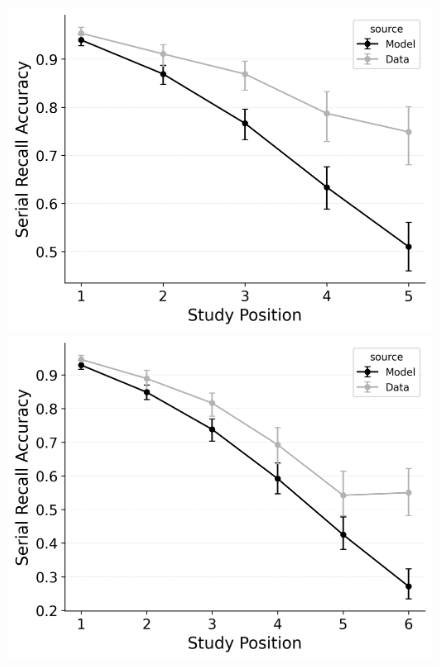 \documentclass[
  man,
  floatsintext,
  longtable,
  nolmodern,
  notxfonts,
  notimes,
  draftfirst,
  colorlinks=true,linkcolor=blue,citecolor=blue,urlcolor=blue]{apa7}
\begin{document}
\begin{figure}
\begin{minipage}{0.33\linewidth}
\includegraphics{figures/bw_Gordon2021_BaseCMR_Confusable_Fitting_srac_LL5.png}\end{minipage}%
%
\begin{minipage}{0.33\linewidth}
\includegraphics{figures/bw_Gordon2021_BaseCMR_Confusable_Fitting_srac_LL6.png}\end{minipage}%
%
\begin{minipage}{0.33\linewidth}

\end{minipage}
\end{figure}
\end{document}
